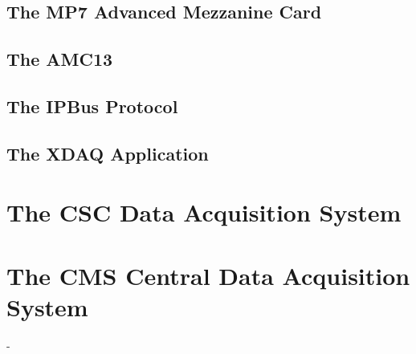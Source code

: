     \subsection{The MP7 Advanced Mezzanine Card}

    \subsection{The AMC13}

    \subsection{The IPBus Protocol}

    \subsection{The XDAQ Application}

  \section{The CSC Data Acquisition System}

  \section{The CMS Central Data Acquisition System}






























-

